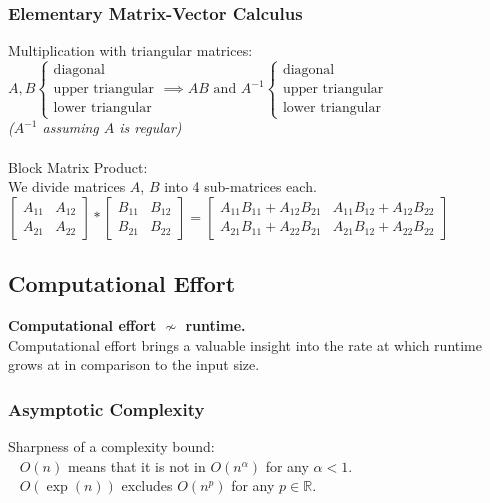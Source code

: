 \documentclass[12pt]{article}
\begin{document}
\subsubsection{Elementary Matrix-Vector Calculus}
Multiplication with triangular matrices:\\
$A,B \begin{cases}\text{diagonal} \\ \text{upper triangular} \\ \text{lower triangular} \end{cases} \implies AB \text{ and } A^{-1} \begin{cases}\text{diagonal} \\ \text{upper triangular} \\ \text{lower triangular} \end{cases}$\\
\textit{($A^{-1}$ assuming $A$ is regular)}\\\\
Block Matrix Product:\\
We divide matrices $A$, $B$ into 4 sub-matrices each.\\
$\begin{bmatrix}A_{11} & A_{12} \\ A_{21} & A_{22} \end{bmatrix} * \begin{bmatrix}B_{11} & B_{12} \\ B_{21} & B_{22}\end{bmatrix} = \begin{bmatrix}A_{11}B_{11} + A_{12}B_{21} & A_{11}B_{12} + A_{12}B_{22} \\ A_{21}B_{11} + A_{22}B_{21} & A_{21}B_{12} + A_{22}B_{22}\end{bmatrix}$
\subsubsection{}
\subsection{Computational Effort}
\textbf{Computational effort $\nsim$ runtime.}\\
Computational effort brings a valuable insight into the rate at which runtime grows at in comparison to the input size.
\subsubsection{Asymptotic Complexity}
Sharpness of a complexity bound:\\
\-\ \hspace*{0.2cm} $O(n)$ means that it is not in $O(n^\alpha)$ for any $\alpha < 1$.\\
\-\ \hspace*{0.2cm} $O(\exp(n))$ excludes $O(n^p)$ for any $p \in \mathbb{R}$.
\end{document}
